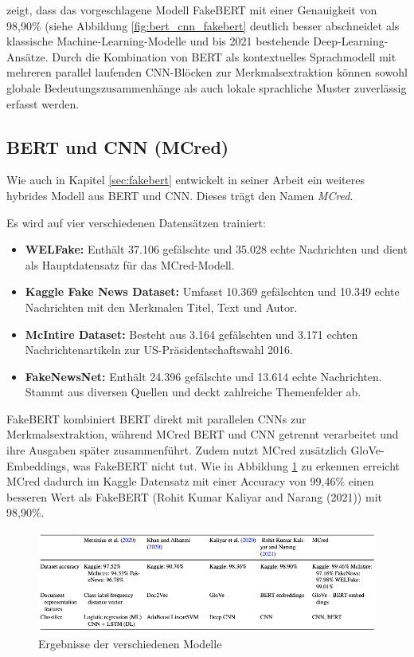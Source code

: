 \cite{Kaliyar:2021aa} zeigt, dass das vorgeschlagene Modell FakeBERT mit einer Genauigkeit von 98,90\% (siehe Abbildung \ref{fig:bert_cnn_fakebert} 
deutlich besser abschneidet als klassische Machine-Learning-Modelle und bis 2021 bestehende Deep-Learning-Ansätze. Durch die Kombination von BERT als 
kontextuelles Sprachmodell mit mehreren parallel laufenden CNN-Blöcken zur Merkmalsextraktion können sowohl globale Bedeutungszusammenhänge als auch 
lokale sprachliche Muster zuverlässig erfasst werden.

\subsection{BERT und CNN (MCred)}

Wie auch in Kapitel \ref{sec:fakebert} entwickelt \cite{Verma:2023aa} in seiner Arbeit ein weiteres hybrides Modell aus BERT und CNN.
Dieses trägt den Namen \textit{MCred}.

Es wird auf vier verschiedenen Datensätzen trainiert:
\begin{itemize}
  \item \textbf{WELFake:} Enthält 37.106 gefälschte und 35.028 echte Nachrichten und dient als Hauptdatensatz für das MCred-Modell.
  \item \textbf{Kaggle Fake News Dataset:} Umfasst 10.369 gefälschten und 10.349 echte Nachrichten mit den Merkmalen Titel, Text und Autor. 
  \item \textbf{McIntire Dataset:} Besteht aus 3.164 gefälschten und 3.171 echten Nachrichtenartikeln zur US-Präsidentschaftswahl 2016.
  \item \textbf{FakeNewsNet:} Enthält 24.396 gefälschte und 13.614 echte Nachrichten. Stammt aus diversen Quellen und deckt zahlreiche Themenfelder ab.
\end{itemize}

FakeBERT kombiniert BERT direkt mit parallelen CNNs zur Merkmalsextraktion, während MCred BERT und CNN getrennt verarbeitet und 
ihre Ausgaben später zusammenführt. Zudem nutzt MCred zusätzlich GloVe-Embeddings, was FakeBERT nicht tut. 
Wie in Abbildung \ref{fig:bert_cnn_mcred} zu erkennen erreicht MCred dadurch im Kaggle Datensatz mit einer Accuracy von 99,46\% 
einen besseren Wert als FakeBERT (Rohit Kumar Kaliyar and Narang (2021)) mit 98,90\%.

\begin{figure}[htbp]
    \begin{center}
    \includegraphics[width=\linewidth]{static/bert_cnn_mcred.png}
    \caption{\label{fig:bert_cnn_mcred} Ergebnisse der verschiedenen Modelle \cite{Verma:2023aa}}
    \end{center}
\end{figure}

